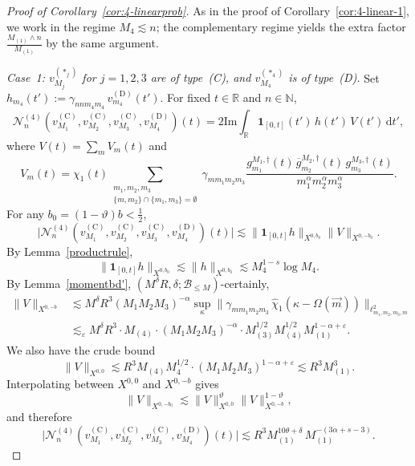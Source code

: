 \documentclass[11pt,reqno,english]{amsart}
\numberwithin{equation}{section}
\theoremstyle{plain}
\theoremstyle{definition}
\theoremstyle{remark}
\newcommand{\ov}{\overline}
\def\Im{\textrm{Im}}
\newcommand{\R}{\mathbb{R}}
\newcommand{\N}{\mathbb{N}}
\newcommand{\dd}{\mathrm{d}}
\begin{document}
\begin{proof}[Proof of Corollary~\ref{cor:4-linearprob}]
	As in the proof of Corollary~\ref{cor:4-linear-1}, we work in the regime $M_4\lesssim n$; the complementary regime yields the extra factor $\frac{M_{(1)}\wedge n}{M_{(1)}}$ by the same argument.

	\emph{Case~1: $v_{M_j}^{(\ast_j)}$ for $j=1,2,3$ are of type~(C), and $v_{M_4}^{(\ast_4)}$ is of type~(D).}
	Set $h_{m_4}(t'):=\gamma_{nnm_4m_4}\, v_{m_4}^{(\mathrm{D})}(t')$.
	For fixed $t\in\R$ and $n\in\N$,
	\[
	\mathcal{N}_n^{(4)}(v_{M_1}^{(\mathrm{C})},v_{M_2}^{(\mathrm{C})},v_{M_3}^{(\mathrm{C})},v_{M_4}^{(\mathrm{D})})(t)
	=
	2\Im \int_{\R}\mathbf{1}_{[0,t]}(t')\, h(t')\,V(t')\,\dd t',
	\]
	where $V(t)=\sum_m V_m(t)$ and
	\[
	V_m(t)=\chi_1(t)\sum_{\substack{m_1,m_2,m_3\\
			\{m,m_2\}\cap\{m_1,m_3\}=\emptyset}}
	\gamma_{mm_1m_2m_3}
	\frac{g_{m_1}^{M_1,\dag}(t)\,\ov{g}_{m_2}^{M_2,\dag}(t)\,g_{m_3}^{M_3,\dag}(t)}
	{m_1^\alpha m_2^\alpha m_3^\alpha}.
	\]
	For any $b_0=(1-\vartheta)b<\frac12$,
	\[
	\big|\mathcal{N}_n^{(4)}(v_{M_1}^{(\mathrm{C})},v_{M_2}^{(\mathrm{C})},v_{M_3}^{(\mathrm{C})},v_{M_4}^{(\mathrm{D})})(t)\big|
	\lesssim
	\|\mathbf{1}_{[0,t]}h\|_{X^{0,b_0}}\|V\|_{X^{0,-b_0}}.
	\]
	By Lemma~\ref{productrule},
	\[
	\|\mathbf{1}_{[0,t]}h\|_{X^{0,b_0}}
	\lesssim
	\|h\|_{X^{0,b_0}}
	\lesssim
	M_4^{1-s}\log M_4.
	\]
	By Lemma~\ref{momentbd'}, $(M^\delta R,\delta;\mathcal{B}_{\le M})$-certainly,
	\begin{align*}
		\|V\|_{X^{0,-b}}
		&\lesssim
		M^\delta R^3 (M_1 M_2 M_3)^{-\alpha}
		\sup_{\kappa}\|\gamma_{mm_1m_2m_3}\,\widehat{\chi}_1(\kappa-\Omega(\vec m))\|_{\ell_{m_1,m_2,m_3,m}^2}\\
		&\lesssim_{\varepsilon}
		M^\delta R^3\cdot M_{(4)}\cdot(M_1 M_2 M_3)^{-\alpha}
		\cdot M_{(3)}^{1/2}M_{(4)}^{1/2}M_{(1)}^{1-\alpha+\varepsilon}.
	\end{align*}
	We also have the crude bound
	\[
	\|V\|_{X^{0,0}}
	\lesssim
	R^3 M_{(4)}M_4^{1/2}\cdot (M_1 M_2 M_3)^{1-\alpha+\varepsilon}
	\lesssim
	R^3 M_{(1)}^3.
	\]
	Interpolating between $X^{0,0}$ and $X^{0,-b}$ gives
	\[
	\|V\|_{X^{0,-b_0}}
	\lesssim
	\|V\|_{X^{0,0}}^{\vartheta}\|V\|_{X^{0,-b}}^{1-\vartheta},
	\]
	and therefore
	\[
	\big|\mathcal{N}_n^{(4)}(v_{M_1}^{(\mathrm{C})},v_{M_2}^{(\mathrm{C})},v_{M_3}^{(\mathrm{C})},v_{M_4}^{(\mathrm{D})})(t)\big|
	\lesssim
	R^3 M_{(1)}^{10\theta+\delta}\, M_{(1)}^{-(3\alpha+s-3)}.
	\]


\end{proof}
\end{document}
